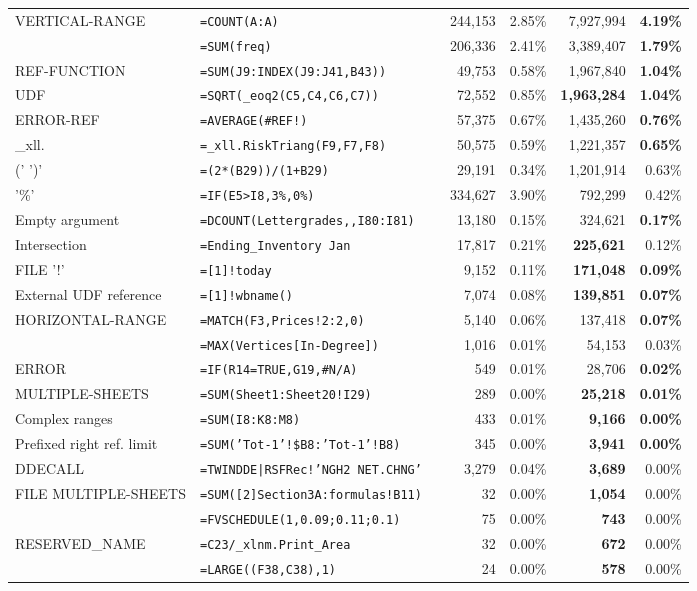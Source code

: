 \begin{tabular}{llrrrrr}
			VERTICAL-RANGE & \texttt{=COUNT(A:A)} &  & 244,153 & 2.85\% & 7,927,994 & \textbf{4.19\%}\\
			\synt{NamedRange} & \texttt{=SUM(freq)} &  & 206,336 & 2.41\% & 3,389,407 & \textbf{1.79\%}\\
			REF-FUNCTION & \texttt{=SUM(J9:INDEX(J9:J41,B43))} &  & 49,753 & 0.58\% & 1,967,840 & \textbf{1.04\%}\\
			UDF & \texttt{=SQRT(_eoq2(C5,C4,C6,C7))} &  & 72,552 & 0.85\% & \textbf{1,963,284} & \textbf{1.04\%}\\
			ERROR-REF & \texttt{=AVERAGE(\#REF!)} &  & 57,375 & 0.67\% & 1,435,260 & \textbf{0.76\%}\\
			_xll. & \texttt{=_xll.RiskTriang(F9,F7,F8)} &  & 50,575 & 0.59\% & 1,221,357 & \textbf{0.65\%}\\
			(' \synt{Reference} ')' & \texttt{=(2*(B29))/(1+B29)} &  & 29,191 & 0.34\% & 1,201,914 & 0.63\%\\
			'\%' & \texttt{=IF(E5>I8,3\%,0\%)} &  & 334,627 & 3.90\% & 792,299 & 0.42\%\\
			Empty argument & \texttt{=DCOUNT(Lettergrades,,I80:I81)} &  & 13,180 & 0.15\% & 324,621 & \textbf{0.17\%}\\
			Intersection & \texttt{=Ending_Inventory Jan} &  & 17,817 & 0.21\% & \textbf{225,621} & 0.12\%\\
			FILE '!' & \texttt{=[1]!today} &  & 9,152 & 0.11\% & \textbf{171,048} & \textbf{0.09\%}\\
			External UDF reference & \texttt{=[1]!wbname()} &  & 7,074 & 0.08\% & \textbf{139,851} & \textbf{0.07\%}\\
			HORIZONTAL-RANGE & \texttt{=MATCH(F3,Prices!2:2,0)} &  & 5,140 & 0.06\% & 137,418 & \textbf{0.07\%}\\
			\synt{StructureReference} & \texttt{=MAX(Vertices[In-Degree])} &  & 1,016 & 0.01\% & 54,153 & 0.03\%\\
			ERROR & \texttt{=IF(R14=TRUE,G19,\#N/A)} &  & 549 & 0.01\% & 28,706 & \textbf{0.02\%}\\
			MULTIPLE-SHEETS & \texttt{=SUM(Sheet1:Sheet20!I29)} &  & 289 & 0.00\% & \textbf{25,218} & \textbf{0.01\%}\\
			Complex ranges & \texttt{=SUM(I8:K8:M8)} &  & 433 & 0.01\% & \textbf{9,166} & \textbf{0.00\%}\\
			Prefixed right ref. limit & \texttt{=SUM('Tot-1'!\$B8:'Tot-1'!B8)} &  & 345 & 0.00\% & \textbf{3,941} & \textbf{0.00\%}\\
			DDECALL & \texttt{=TWINDDE|RSFRec!'NGH2 NET.CHNG'} &  & 3,279 & 0.04\% & \textbf{3,689} & 0.00\%\\
			FILE MULTIPLE-SHEETS & \texttt{=SUM([2]Section3A:formulas!B11)} &  & 32 & 0.00\% & \textbf{1,054} & 0.00\%\\
			\synt{ConstantArray} & \texttt{=FVSCHEDULE(1,{0.09;0.11;0.1})} &  & 75 & 0.00\% & \textbf{743} & 0.00\%\\
			RESERVED_NAME & \texttt{=C23/_xlnm.Print_Area} &  & 32 & 0.00\% & \textbf{672} & 0.00\%\\
			\synt{Union} & \texttt{=LARGE((F38,C38),1)} &  & 24 & 0.00\% & \textbf{578} & 0.00\%\\
			\hline
	\end{tabular}